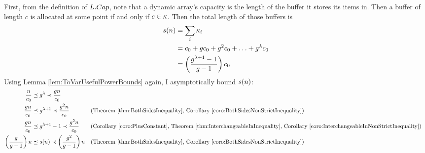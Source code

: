 First, from the definition of $L.Cap$, note that a dynamic array's capacity is the length of the buffer it stores its items in. Then a buffer of length $c$ is allocated at some point if and only if $c \in \kappa$. Then the total length of those buffers is
\begin{align*}
s(n) &= \sum_i {\kappa_i}\\
&= c_0 + gc_0 + g^2c_0 + \ldots + g^\lambda c_0\\
&= \left( \frac{g^{\lambda + 1} - 1}{g - 1} \right) c_0
\end{align*}
Using Lemma \ref{lem:ToVarUsefulPowerBounds} again, I asymptotically bound $s(n)$:
\begin{align*}
\frac n {c_0} &\preceq g^\lambda \prec \frac {g{n}} {c_0}\\
\frac {g n} {c_0} &\preceq g^{\lambda + 1} \prec \frac {g^2 n} {c_0} &&\text{(Theorem \ref{thm:BothSidesInequality}, Corollary \ref{coro:BothSidesNonStrictInequality})}\\
\frac {g n} {c_0} &\preceq g^{\lambda + 1} - 1 \prec \frac {g^2 n} {c_0} &&\text{(Corollary \ref{coro:PlusConstant}, Theorem \ref{thm:InterchangeableInInequality}, Corollary \ref{coro:InterchangeableInNonStrictInequality})}\\
\left( \frac{g}{g - 1} \right) n &\preceq s(n) \prec \left( \frac{g^2}{g - 1} \right) n &&\text{(Theorem \ref{thm:BothSidesInequality}, Corollary \ref{coro:BothSidesNonStrictInequality})}
\end{align*}
